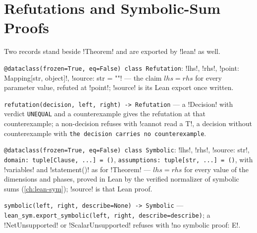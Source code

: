 \section{Refutations and Symbolic-Sum Proofs}\label{sec:kernel-refute}

Two records stand beside \py!Theorem! and are exported by \py!lean! as well.

\begin{signature}
\texttt{@dataclass(\allowbreak{}frozen=True,\allowbreak{} eq=False) class Refutation}: \py!lhs!, \py!rhs!, \py!point: Mapping[str, object]!, \py!source: str = ""! --- the claim $\mathit{lhs}=\mathit{rhs}$ for every parameter value, refuted at \code!point!; \code!source! is its Lean export once written.

\texttt{refutation(\allowbreak{}decision,\allowbreak{} left,\allowbreak{} right) -> Refutation} --- a \py!Decision! with verdict \texttt{UNEQUAL} and a counterexample gives the refutation at that counterexample; a non-decision refuses with \code!cannot read a T!, a decision without counterexample with \texttt{the decision carries no counterexample}.

\texttt{@dataclass(\allowbreak{}frozen=True,\allowbreak{} eq=False) class Symbolic}: \py!lhs!, \py!rhs!, \py!source: str!, \texttt{domain: tuple[Clause,\allowbreak{} .\allowbreak{}.\allowbreak{}.\allowbreak{}] = (\allowbreak{})}, \texttt{assumptions: tuple[str,\allowbreak{} .\allowbreak{}.\allowbreak{}.\allowbreak{}] = (\allowbreak{})}, with \py!variables! and \py!statement()! as for \py!Theorem! --- $\mathit{lhs}=\mathit{rhs}$ for every value of the dimensions and phases, proved in Lean by the verified normalizer of symbolic sums (\cref{ch:lean-sym}); \code!source! is that Lean proof.

\texttt{symbolic(\allowbreak{}left,\allowbreak{} right,\allowbreak{} describe=None) -> Symbolic} --- \texttt{lean\_\allowbreak{}sym.\allowbreak{}export\_\allowbreak{}symbolic(\allowbreak{}left,\allowbreak{} right,\allowbreak{} describe=describe)}; a \py!NetUnsupported! or \py!ScalarUnsupported! refuses with \code!no symbolic proof: E!.
\end{signature}

